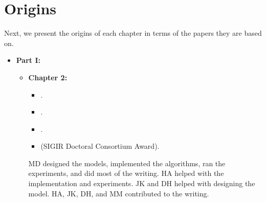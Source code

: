 \section{Origins}
Next, we present the origins of each chapter in terms of the papers they are based on.
\begin{itemize}
    \setlength{\itemindent}{-28pt}
    \item[]\textbf{Part I:} \emph{}
%  
        \begin{itemize}
            \setlength{\itemindent}{-33pt}
            \item[]\textbf{Chapter 2:} \emph{}
            \begin{itemize}[label=\textbullet] 
                \item {}.
                \item {}.
                \item {}.
                \item {} (SIGIR Doctoral Consortium Award).
            \end{itemize}
            
            {\footnotesize{MD designed the models, implemented the algorithms, ran the experiments, and did most of the writing. HA helped with the implementation and experiments. JK and DH helped with designing the model. HA, JK, DH, and MM contributed to the writing.}\medskip}
            

\end{itemize}
\end{itemize}
